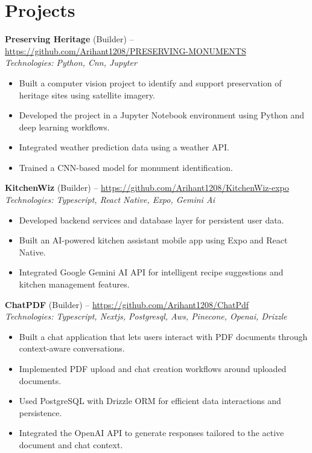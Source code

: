 \documentclass[11pt,a4paper]{article}
\begin{document}
\section{Projects}
\textbf{Preserving Heritage} (Builder) -- \href{https://github.com/Arihant1208/PRESERVING-MONUMENTS}{https://github.com/Arihant1208/PRESERVING-MONUMENTS}
\\ \textit{Technologies: Python, Cnn, Jupyter}
\begin{itemize}
  \item Built a computer vision project to identify and support preservation of heritage sites using satellite imagery.
  \item Developed the project in a Jupyter Notebook environment using Python and deep learning workflows.
  \item Integrated weather prediction data using a weather API.
  \item Trained a CNN-based model for monument identification.
\end{itemize}
\vspace{2pt}
\textbf{KitchenWiz} (Builder) -- \href{https://github.com/Arihant1208/KitchenWiz-expo}{https://github.com/Arihant1208/KitchenWiz-expo}
\\ \textit{Technologies: Typescript, React Native, Expo, Gemini Ai}
\begin{itemize}
  \item Developed backend services and database layer for persistent user data.
  \item Built an AI-powered kitchen assistant mobile app using Expo and React Native.
  \item Integrated Google Gemini AI API for intelligent recipe suggestions and kitchen management features.
\end{itemize}
\vspace{2pt}
\textbf{ChatPDF} (Builder) -- \href{https://github.com/Arihant1208/ChatPdf}{https://github.com/Arihant1208/ChatPdf}
\\ \textit{Technologies: Typescript, Nextjs, Postgresql, Aws, Pinecone, Openai, Drizzle}
\begin{itemize}
  \item Built a chat application that lets users interact with PDF documents through context-aware conversations.
  \item Implemented PDF upload and chat creation workflows around uploaded documents.
  \item Used PostgreSQL with Drizzle ORM for efficient data interactions and persistence.
  \item Integrated the OpenAI API to generate responses tailored to the active document and chat context.
\end{itemize}
\vspace{2pt}
\end{document}
